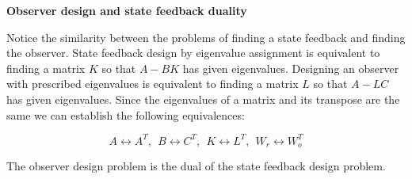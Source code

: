 \begin{framed}
\theoremstyle{remark}
\begin{remark}{\textbf{Observer design and state feedback duality}}


Notice the similarity between the problems of finding a state feedback and
finding the observer. State feedback design by eigenvalue assignment is equivalent
to finding a matrix $K$ so that $A-BK$ has given eigenvalues. Designing an observer
with prescribed eigenvalues is equivalent to finding a matrix $L$ so that $A-LC$ has
given eigenvalues. Since the eigenvalues of a matrix and its transpose are the same
we can establish the following equivalences:

\begin{equation}
A \leftrightarrow A^T, ~~ B \leftrightarrow C^T, ~~ K \leftrightarrow L^T, ~~ W_r \leftrightarrow W_{o}^{T}
\end{equation}

The observer design problem is the dual of the state feedback design problem. 
\end{remark}
\end{framed}



